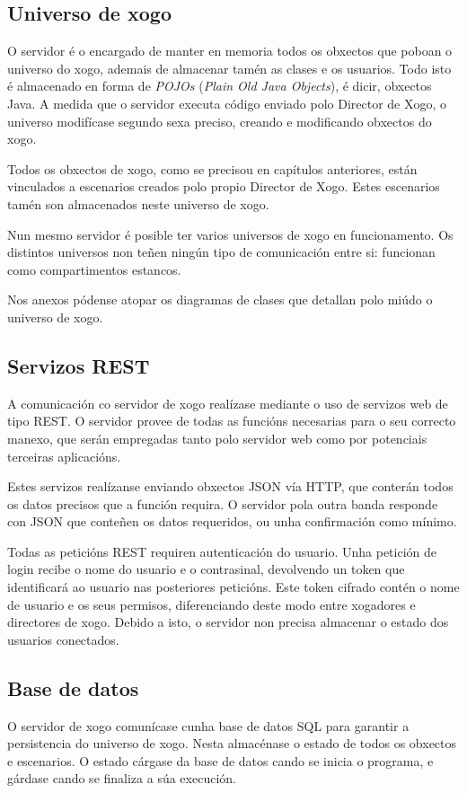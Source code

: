 \subsection{Universo de xogo}
O servidor é o encargado de manter en memoria todos os obxectos que poboan o
universo do xogo, ademais de almacenar tamén as clases e os usuarios. Todo isto
é almacenado en forma de {\it POJOs} ({\it Plain Old Java Objects}), é dicir,
obxectos Java. A medida que o servidor executa código enviado polo Director de
Xogo, o universo modifícase segundo sexa preciso, creando e modificando
obxectos do xogo.
\par
Todos os obxectos de xogo, como se precisou en capítulos anteriores, están
vinculados a escenarios creados polo propio Director de Xogo. Estes escenarios
tamén son almacenados neste universo de xogo.
\par
Nun mesmo servidor é posible ter varios universos de xogo en funcionamento. Os
distintos universos non teñen ningún tipo de comunicación entre si: funcionan
como compartimentos estancos.
\par
Nos anexos pódense atopar os diagramas de clases que detallan polo miúdo o
universo de xogo.

\subsection{Servizos REST}
A comunicación co servidor de xogo realízase mediante o uso de servizos web
de tipo REST.
O servidor provee de todas as funcións necesarias para o seu correcto manexo, que
serán empregadas tanto polo servidor web como por potenciais terceiras
aplicacións.
\par
Estes servizos realízanse enviando obxectos JSON vía HTTP, que conterán todos os
datos precisos que a función requira. O servidor pola outra banda responde con
JSON que conteñen os datos requeridos, ou unha confirmación como mínimo.
\par
Todas as peticións REST requiren autenticación do usuario. Unha petición
de login recibe o nome do usuario e o contrasinal, devolvendo un token que
identificará ao usuario nas posteriores peticións. Este token cifrado contén o
nome de usuario e os seus permisos, diferenciando deste modo entre xogadores e
directores de xogo. Debido a isto, o servidor non precisa almacenar o estado dos
usuarios conectados.

\subsection{Base de datos}
O servidor de xogo comunícase cunha base de datos SQL para garantir a
persistencia do universo de xogo. Nesta almacénase o estado de todos os obxectos
e escenarios. O estado cárgase da base de datos cando se inicia o programa, e
gárdase cando se finaliza a súa execución.

